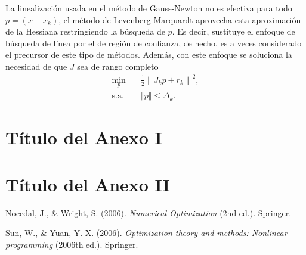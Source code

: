 \documentclass[11pt,a4paper]{book}
\theoremstyle{definition}
\theoremstyle{remark}
\newcommand{\norm}[1]{\left\lVert#1\right\rVert}
\begin{document}
La linealización usada en el método de Gauss-Newton no es efectiva para todo $p=(x-x_k)$, el método de Levenberg-Marquardt aprovecha esta aproximación de la Hessiana restringiendo la búsqueda de $p$. Es decir, sustituye el enfoque de búsqueda de línea por el de región de confianza, de hecho, es a veces considerado el precursor de este tipo de métodos. Además, con este enfoque se soluciona la necesidad de que $J$ sea de rango completo
\begin{align}
	\min_{p} \quad &\frac{1}{2} \norm{J_kp+r_k}^2, \\
	\text{s.a.} \quad & \Vert p \Vert \leq \Delta_k.
\end{align}

\appendix
\renewcommand{\thechapter}{\Roman{chapter}}
\chapter{Título del Anexo I}


\chapter{Título del Anexo II}

\backmatter

\begin{thebibliography}{99}

%


 Nocedal, J., \& Wright, S. (2006). \emph{Numerical Optimization} (2nd ed.). Springer.

 Sun, W., \& Yuan, Y.-X. (2006). \emph{Optimization theory and methods: Nonlinear programming} (2006th ed.). Springer.

%
\end{thebibliography}
\end{document}
